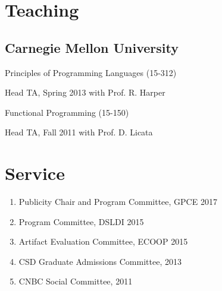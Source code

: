 \documentclass[10pt,letterpaper]{article}
\renewenvironment{itemize}{
  \begin{list}{}{
    \setlength{\leftmargin}{1.5em}
    \setlength{\itemsep}{0.25em}
    \setlength{\parskip}{0pt}
    \setlength{\parsep}{0.25em}
  }
}{
  \end{list}
}
\begin{document}
%


\section*{Teaching}
\subsection*{Carnegie Mellon University}
\begin{itemize}
  \item Principles of Programming Languages (15-312)
    \begin{itemize}
      \item Head TA, Spring 2013 with Prof. R. Harper
    \end{itemize}
  \item Functional Programming (15-150)
    \begin{itemize}
      \item Head TA, Fall 2011 with Prof. D. Licata
    \end{itemize}
\end{itemize}

\section*{Service}
\begin{enumerate}
  \item Publicity Chair and Program Committee, GPCE 2017
  \item Program Committee, DSLDI 2015
  \item Artifact Evaluation Committee, ECOOP 2015
  \item CSD Graduate Admissions Committee, 2013
  \item CNBC Social Committee, 2011
\end{enumerate}
\end{document}
